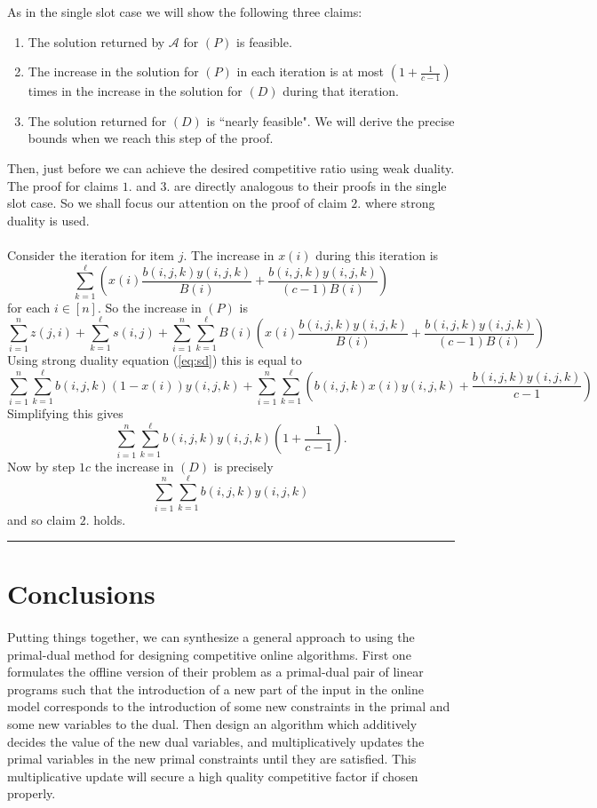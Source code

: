 \documentclass[letterpaper,12pt,oneside,onecolumn]{article}
\newcommand{\cA}{\mathcal{A}} \newcommand{\cB}{\mathcal{B}}
\newenvironment{proof}{{\bf Proof:  }}{\hfill\rule{2mm}{2mm}}
\begin{document}
\begin{proof}
As in the single slot case we will show the following three claims:
\begin{enumerate}
\item The solution returned by $\cA$ for $(P)$ is feasible.
\item The increase in the solution for $(P)$ in each iteration is at most $(1+\frac{1}{c-1})$ times in the increase in the solution for $(D)$ during that iteration.
\item The solution returned for $(D)$ is ``nearly feasible". We will derive the precise bounds when we reach this step of the proof. 
\end{enumerate}
Then, just before we can achieve the desired competitive ratio using weak duality.  The proof for claims $1.$ and $3.$ are directly analogous to their proofs in the single slot case. So we shall focus our attention on the proof of claim $2.$ where strong duality is used.
\paragraph{}
Consider the iteration for item $j$. The increase in $x(i)$ during this iteration is 
$$ \sum_{k=1}^\ell (x(i)\frac{b(i,j,k)y(i,j,k)}{B(i)} + \frac{b(i,j,k)y(i,j,k)}{(c-1)B(i)})$$
for each $i \in [n]$. So the increase in $(P)$ is
$$\sum_{i=1}^n z(j,i) + \sum_{k=1}^\ell s(i,j) +\sum_{i=1}^n\sum_{k=1}^\ell B(i) (x(i)\frac{b(i,j,k)y(i,j,k)}{B(i)} + \frac{b(i,j,k)y(i,j,k)}{(c-1)B(i)})$$
Using strong duality equation (\ref{eq:sd}) this is equal to
$$\sum_{i=1}^n \sum_{k=1}^\ell b(i,j,k)(1-x(i))y(i,j,k) + \sum_{i=1}^n \sum_{k=1}^\ell (b(i,j,k)x(i)y(i,j,k) + \frac{b(i,j,k)y(i,j,k)}{c-1}) $$
Simplifying this gives
$$\sum_{i=1}^n \sum_{k=1}^\ell b(i,j,k)y(i,j,k)(1+\frac{1}{c-1}).$$
Now by step $1c$ the increase in $(D)$ is precisely
$$\sum_{i=1}^n \sum_{k=1}^\ell b(i,j,k)y(i,j,k)$$
and so claim $2.$ holds.
\end{proof}
\section{Conclusions}
\paragraph{}
Putting things together, we can synthesize a general approach to using the primal-dual method for designing competitive online algorithms. First one formulates the offline version of their problem as a primal-dual pair of linear programs such that the introduction of a new part of the input in the online model corresponds to the introduction of some new constraints in the primal and some new variables to the dual. Then design an algorithm which additively decides the value of the new dual variables, and multiplicatively updates the primal variables in the new primal constraints until they are satisfied. This multiplicative update will secure a high quality competitive factor if chosen properly.
\end{document}

